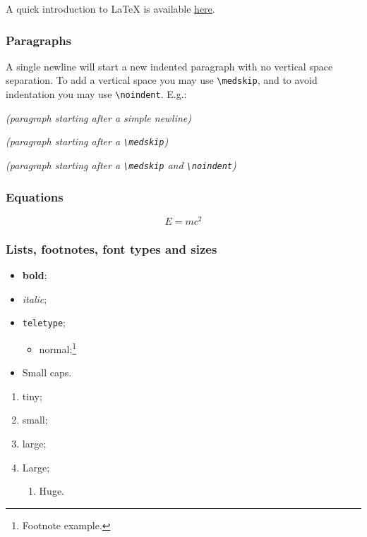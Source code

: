 A quick introduction to \LaTeX{} is available \href{https://www.overleaf.com/learn/latex/Learn_LaTeX_in_30_minutes}{here}.


\subsubsection{Paragraphs}

A single newline will start a new indented paragraph with no vertical space separation.  To add a vertical space you may use \verb|\medskip|, and to avoid indentation you may use \verb|\noindent|. E.g.:

{\it (paragraph starting after a simple newline)} \lipsum[2]

\medskip

{\it (paragraph starting after a \verb|\medskip|)} \lipsum[3]

\medskip

\noindent
{\it (paragraph starting after a \verb|\medskip| and \verb|\noindent|)} \lipsum[4]



\subsubsection{Equations}

\begin{equation}
  \label{eq:eq}
  E = mc^2
\end{equation}


\subsubsection{Lists, footnotes, font types and sizes}

\begin{itemize}
\item {\bf bold};
\item {\it italic};
\item {\tt teletype};
  \begin{itemize}
  \item normal;\footnote{Footnote example.}
  \end{itemize}
\item {\sc Small caps}.
\end{itemize}

\begin{enumerate}
\item {\tiny tiny};
\item {\small small};
\item {\large large};
\item {\Large Large};
  \begin{enumerate}
  \item {\Huge Huge}.
  \end{enumerate}
\end{enumerate}


